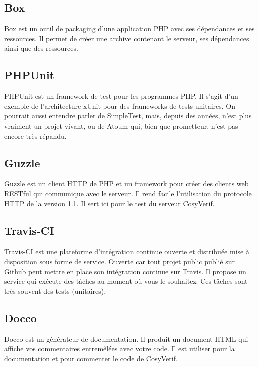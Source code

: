 \documentclass{report}
\begin{document}
\subsection{Box}

Box est un outil de packaging d'une application PHP avec ses dépendances et ses ressources.
Il permet de créer une archive contenant le serveur, ses dépendances ainsi
que des ressources.

\subsection{PHPUnit}

PHPUnit est un framework de test pour les programmes PHP. Il s'agit d'un exemple de l'architecture xUnit pour des frameworks 
de tests unitaires. On pourrait aussi entendre parler de SimpleTest, mais, depuis des années, n’est plus vraiment un 
projet vivant, ou de Atoum qui, bien que prometteur, n’est pas encore très répandu.

\subsection{Guzzle}

Guzzle est un client HTTP de PHP et un framework pour créer des clients web RESTful qui communique avec le serveur. 
Il rend facile l'utilisation du protocole HTTP de la version 1.1. Il sert ici pour le test du serveur CosyVerif.

\subsection{Travis-CI}

Travis-CI est une plateforme d’intégration continue ouverte et distribuée mise à disposition sous forme de service. Ouverte car 
tout projet public publié sur Github peut mettre en place son intégration continue sur Travis. Il propose un service qui 
exécute des tâches au moment où vous le souhaitez. Ces tâches sont très souvent des tests (unitaires).

\subsection{Docco}

Docco est un générateur de documentation. Il produit un document HTML qui affiche vos commentaires entremêlées avec 
votre code. Il est utiliser pour la documentation et pour commenter le code de CosyVerif.
\end{document}
